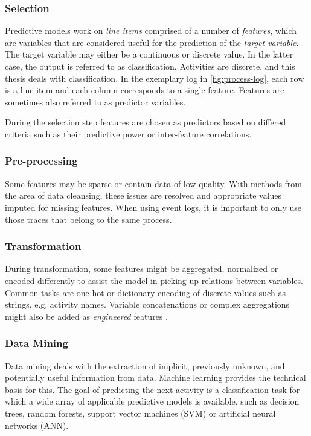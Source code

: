 \subsubsection*{Selection}
Predictive models work on \textit{line items} comprised of a number of \textit{features}, which are variables that are considered useful for the prediction of the \textit{target variable}. The target variable may either be a continuous or discrete value. In the latter case, the output is referred to as classification. Activities are discrete, and this thesis deals with classification.
In the exemplary log in \autoref{fig:process-log}, each row is a line item and each column corresponds to a single feature. Features are sometimes also referred to as predictor variables.

During the selection step features are chosen as predictors based on differed criteria such as their predictive power or inter-feature correlations.

\subsubsection*{Pre-processing}
Some features may be sparse or contain data of low-quality. With methods from the area of data cleansing, these issues are resolved and appropriate values imputed for missing features. When using event logs, it is important to only use those traces that belong to the same process.

\subsubsection*{Transformation}
\label{sec:predictive-model-development:transformation}
During transformation, some features might be aggregated, normalized or encoded differently to assist the model in picking up relations between variables. Common tasks are one-hot or dictionary encoding of discrete values such as strings, e.g. activity names. Variable concatenations or complex aggregations might also be added as \textit{engineered} features \cite{schoenig2018}.

\subsubsection*{Data Mining}
Data mining deals with the extraction of implicit, previously unknown, and potentially useful information from data. Machine learning provides the technical basis for this. The goal of predicting the next activity is a classification task for which a wide array of applicable predictive models is available, such as decision trees, random forests, support vector machines (SVM) or artificial neural networks (ANN).

